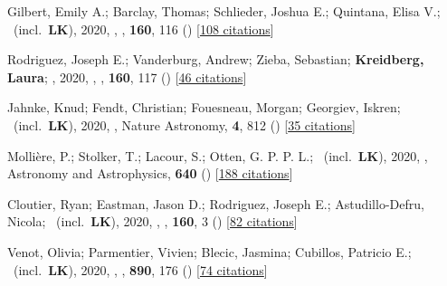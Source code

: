 \item[{\color{numcolor}\scriptsize39}] Gilbert, Emily A.; Barclay, Thomas; Schlieder, Joshua E.; Quintana, Elisa V.; \etal\ (incl.\ \textbf{LK}), 2020, , \aj, \textbf{160}, 116 () [\href{https://ui.adsabs.harvard.edu/abs/2020AJ....160..116G}{108 citations}]

\item[{\color{numcolor}\scriptsize38}] Rodriguez, Joseph E.; Vanderburg, Andrew; Zieba, Sebastian; \textbf{Kreidberg, Laura}; \etal, 2020, , \aj, \textbf{160}, 117 () [\href{https://ui.adsabs.harvard.edu/abs/2020AJ....160..117R}{46 citations}]

\item[{\color{numcolor}\scriptsize37}] Jahnke, Knud; Fendt, Christian; Fouesneau, Morgan; Georgiev, Iskren; \etal\ (incl.\ \textbf{LK}), 2020, , Nature Astronomy, \textbf{4}, 812 () [\href{https://ui.adsabs.harvard.edu/abs/2020NatAs...4..812J}{35 citations}]

\item[{\color{numcolor}\scriptsize36}] Molli{\`e}re, P.; Stolker, T.; Lacour, S.; Otten, G. P. P. L.; \etal\ (incl.\ \textbf{LK}), 2020, , Astronomy and Astrophysics, \textbf{640} () [\href{https://ui.adsabs.harvard.edu/abs/2020A&A...640A.131M}{188 citations}]

\item[{\color{numcolor}\scriptsize35}] Cloutier, Ryan; Eastman, Jason D.; Rodriguez, Joseph E.; Astudillo-Defru, Nicola; \etal\ (incl.\ \textbf{LK}), 2020, , \aj, \textbf{160}, 3 () [\href{https://ui.adsabs.harvard.edu/abs/2020AJ....160....3C}{82 citations}]

\item[{\color{numcolor}\scriptsize34}] Venot, Olivia; Parmentier, Vivien; Blecic, Jasmina; Cubillos, Patricio E.; \etal\ (incl.\ \textbf{LK}), 2020, , \apj, \textbf{890}, 176 () [\href{https://ui.adsabs.harvard.edu/abs/2020ApJ...890..176V}{74 citations}]

